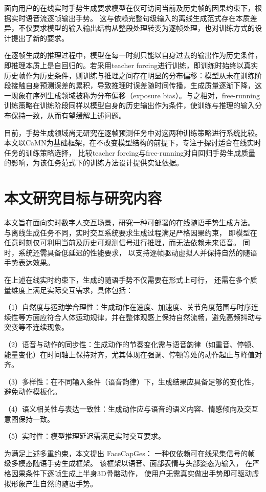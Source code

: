 面向用户的在线实时手势生成要求模型在仅可访问当前及历史帧的因果约束下，根据实时语音流逐帧输出手势。
这与依赖完整句级输入的离线生成范式存在本质差异，不仅要求模型的输入输出结构从整段处理转变为逐帧处理，也对训练方式的设计提出了新的要求。

在逐帧生成的推理过程中，模型在每一时刻只能以自身过去的输出作为历史条件，即推理本质上是自回归的。若采用teacher forcing进行训练，即训练时始终以真实历史帧作为历史条件，则训练与推理之间存在明显的分布偏移：模型从未在训练阶段接触自身预测误差的累积，导致推理时误差随时间传播，生成质量逐渐下降，这一现象在序列生成领域被称为分布偏移（exposure bias）\cite{bengio2015scheduled}。与之相对，free-running训练策略在训练阶段同样以模型自身的历史输出作为条件，使训练与推理的输入分布保持一致，从而有望缓解上述问题。

目前，手势生成领域尚无研究在逐帧预测任务中对这两种训练策略进行系统比较。
本文以CaMN为基础框架，在不改变模型结构的前提下，专注于探讨适合在线实时任务的训练策略选择，
比较teacher forcing与free-running对自回归手势生成质量的影响，为该任务范式下的训练方法设计提供实证依据。

\section{本文研究目标与研究内容}

本文旨在面向实时数字人交互场景，研究一种可部署的在线随语手势生成方法。
与离线生成任务不同，实时交互系统要求生成过程满足严格因果约束，
即模型在任意时刻仅可利用当前及历史可观测信号进行推理，而无法依赖未来语音。
同时，系统还需具备低延迟的性能要求，
以支持逐帧驱动虚拟人并保持自然的随语手势表达效果。

在上述在线实时约束下，生成的随语手势不仅需要在形式上可行，
还需在多个质量维度上满足实际交互需求，具体包括：

（1）自然度与运动学合理性：生成动作在速度、加速度、关节角度范围与时序连续性等方面应符合人体运动规律，并在整体观感上保持自然流畅，避免高频抖动与突变等不连续现象。

（2）语音与动作的同步性：生成动作的节奏变化需与语音韵律（如重音、停顿、能量变化）在时间轴上保持对齐，尤其体现在强调、停顿等处的动作起止与峰值对齐。

（3）多样性：在不同输入条件（语音韵律）下，生成结果应具备足够的变化性，避免动作模板化。

（4）语义相关性与表达一致性：生成动作应与语音的语义内容、情感倾向及交互意图保持一致。

（5）实时性：模型推理延迟需满足实时交互要求。

为满足上述多重约束，本文提出 FaceCapGes：
一种仅依赖可在线采集信号的帧级多模态随语手势生成框架。
该框架以语音、面部表情与头部姿态为输入，
在严格因果条件下逐帧生成上半身3D骨骼动作，
使用户无需真实做出手势即可驱动虚拟形象产生自然的随语手势。

